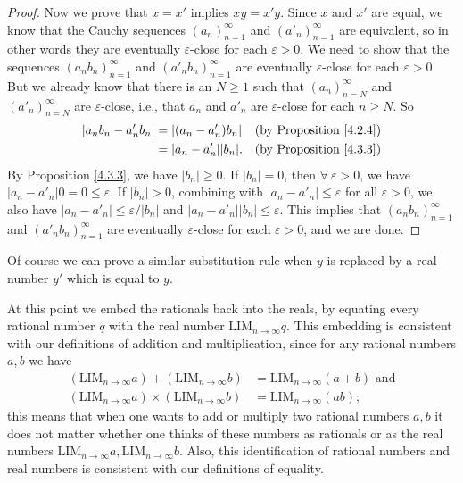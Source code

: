 \begin{proof}
Now we prove that \(x = x'\) implies \(xy = x'y\).
Since \(x\) and \(x'\) are equal, we know that the Cauchy sequences \((a_n)_{n = 1}^{\infty}\) and \((a'_n)_{n = 1}^{\infty}\) are equivalent, so in other words they are eventually \(\varepsilon\)-close for each \(\varepsilon > 0\).
We need to show that the sequences \((a_n b_n)_{n = 1}^{\infty}\) and \((a'_n b_n)_{n = 1}^{\infty}\) are eventually \(\varepsilon\)-close for each \(\varepsilon > 0\).
But we already know that there is an \(N \geq 1\) such that \((a_n)_{n = N}^{\infty}\) and \((a'_n)_{n = N}^{\infty}\) are \(\varepsilon\)-close, i.e., that \(a_n\) and \(a'_n\) are \(\varepsilon\)-close for each \(n \geq N\).
So
\begin{align*}
|a_n b_n - a'_n b_n| &= |(a_n - a'_n)b_n| & \text{(by Proposition \ref{4.2.4})} \\
&= |a_n - a'_n||b_n|. & \text{(by Proposition \ref{4.3.3})}
\end{align*}
By Proposition \ref{4.3.3}, we have \(|b_n| \geq 0\).
If \(|b_n| = 0\), then \(\forall\ \varepsilon > 0\), we have \(|a_n - a'_n|0 = 0 \leq \varepsilon\).
If \(|b_n| > 0\), combining with \(|a_n - a'_n| \leq \varepsilon\) for all \(\varepsilon > 0\), we also have \(|a_n - a'_n| \leq \varepsilon / |b_n|\) and \(|a_n - a'_n||b_n| \leq \varepsilon\).
This implies that \((a_n b_n)_{n = 1}^{\infty}\) and \((a'_n b_n)_{n = 1}^{\infty}\) are eventually \(\varepsilon\)-close for each \(\varepsilon > 0\), and we are done.
\end{proof}

\begin{note}
Of course we can prove a similar substitution rule when \(y\) is replaced by a real number \(y'\) which is equal to \(y\).
\end{note}

\begin{note}
At this point we embed the rationals back into the reals, by equating every rational number \(q\) with the real number \(\text{LIM}_{n \to \infty} q\).
This embedding is consistent with our definitions of addition and multiplication, since for any rational numbers \(a, b\) we have
\begin{align*}
(\text{LIM}_{n \to \infty} a) + (\text{LIM}_{n \to \infty} b) &= \text{LIM}_{n \to \infty} (a + b) \text{ and} \\
(\text{LIM}_{n \to \infty} a) \times (\text{LIM}_{n \to \infty} b) &= \text{LIM}_{n \to \infty} (ab);
\end{align*}
this means that when one wants to add or multiply two rational numbers \(a, b\) it does not matter whether one thinks of these numbers as rationals or as the real numbers \(\text{LIM}_{n \to \infty} a, \text{LIM}_{n \to \infty} b\).
Also, this identification of rational numbers and real numbers is consistent with our definitions of equality.
\end{note}

